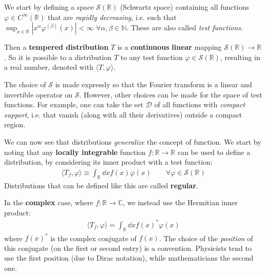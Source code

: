 \documentclass[../template.tex]{subfiles}
\begin{document}
We start by defining a space $\mathcal{S}(\mathbb{R})$ (Schwartz space) containing all functions $\varphi \in C^{\infty}(\mathbb{R})$ that are \textit{rapidly decreasing}, i.e. such that $\sup_{x \in \mathbb{R}} |x^\alpha \varphi^{(\beta)}(x)| < \infty$ $\forall \alpha, \beta \in \mathbb{N}$. These are also called \textit{test functions}. 

\medskip

Then a \textbf{tempered distribution} $T$ is a \textbf{continuous} \textbf{linear} mapping $\mathcal{S}(\mathbb{R}) \to \mathbb{R}$. So it is possible to  a distribution $T$ to any test function $\varphi \in \mathcal{S}(\mathbb{R})$, resulting in a real number, denoted with $\langle T, \varphi \rangle$.

\medskip

The choice of $\mathcal{S}$ is made expressly so that the Fourier transform is a linear and invertible operator on $\mathcal{S}$. However, other choices can be made for the space of test functions. For example, one can take the set $\mathcal{D}$ of all functions with \textit{compact support}, i.e. that vanish (along with all their derivatives) outside a compact region. 

\medskip

We can now see that distributions \textit{generalize} the concept of function. We start by noting that any \textbf{locally integrable} function $f \colon \mathbb{R} \to \mathbb{R}$ can be used to define a distribution, by considering its inner product with a test function:  
\begin{align}
    \langle T_f, \varphi \rangle \equiv \int_{\mathbb{R}} \dd{x} f(x)\varphi(x) \qquad \forall \varphi \in \mathcal{S}(\mathbb{R}) \label{eqn:regular-dist}
\end{align}
Distributions that can be defined like this are called \textbf{regular}. 

\begin{expl}In the \textbf{complex} case, where $f \colon \mathbb{R} \to \mathbb{C}$, we instead use the Hermitian inner product:
    \begin{align*}
        \langle T_f, \varphi \rangle = \int_{\mathbb{R}} \dd{x} f(x)^* \varphi(x)
    \end{align*} 
    where $f(x)^*$ is the complex conjugate of $f(x)$. The choice of the \textit{position} of this conjugate (on the first or second entry) is a convention. Physicists tend to use the first position (due to Dirac notation), while mathematicians the second one.
\end{expl}
\end{document}
